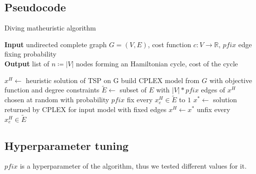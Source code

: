 \subsection{Pseudocode}
\begin{algorithm}[h]
    \caption{Diving matheuristic algorithm}
    \hspace*{\algorithmicindent} \textbf{Input} undirected complete graph $G=(V,E)$, cost function $c:V\rightarrow\mathbb{R}$, $pfix$ edge fixing probability\\
    \hspace*{\algorithmicindent} \textbf{Output} list of $n\coloneq|V|$ nodes forming an Hamiltonian cycle, cost of the cycle
    \begin{algorithmic}

        \State $x^H \leftarrow$ heuristic solution of TSP on G
        \State build CPLEX model from $G$ with objective function and degree constraints
        \State $\tilde{E} \leftarrow$ subset of $E$ with $|V|*pfix$ edges of $x^H$ chosen at random with probability $pfix$
        \State fix every $x_e^H\in\tilde{E}$ to $1$
        \State $x^*\leftarrow$ solution returned by CPLEX for input model with fixed edges
        \State $x^H\leftarrow x^*$
        \EndIf
        \State unfix every $x_e^H\in\tilde{E}$
        \EndWhile

    \end{algorithmic}
\end{algorithm}
\FloatBarrier

\subsection{Hyperparameter tuning}

$pfix$ is a hyperparameter of the algorithm, thus we tested different values for it.

